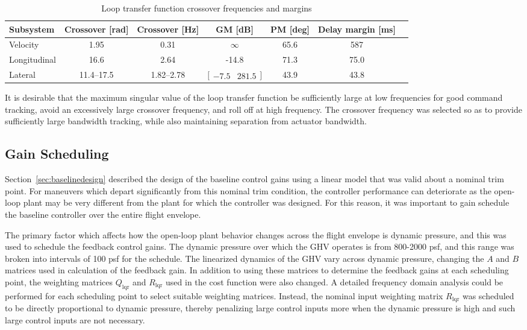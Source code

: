 \documentclass[]{../sty/aiaa-tc}
\begin{document}
  \begin{table}[H]
    \centering
    \caption{Loop transfer function crossover frequencies and margins\label{tab:crossover}}
    \small
    \begin{tabular}{lcccccc}
      \toprule
      Subsystem & Crossover [rad] & Crossover [Hz] & GM [dB] & PM [deg] & Delay margin [ms] \\
      \midrule
      Velocity & 1.95 & 0.31 & $\infty$ & 65.6 & 587 \\
      Longitudinal & 16.6 & 2.64 & -14.8 & 71.3 & 75.0 \\
      Lateral & 11.4--17.5 & 1.82--2.78 & $\bigr[
      \begin{array}{cc}
        -7.5 & 281.5
      \end{array}\bigr]$ & 43.9 & 43.8 \\
      \bottomrule
    \end{tabular}
  \end{table}

  It is desirable that the maximum singular value of the loop transfer function be sufficiently large at low frequencies for good command tracking, avoid an excessively large crossover frequency, and roll off at high frequency.
  The crossover frequency was selected so as to provide sufficiently large bandwidth tracking, while also maintaining separation from actuator bandwidth.

  \subsection{Gain Scheduling}

  Section~\ref{sec:baselinedesign} described the design of the baseline control gains using a linear model that was valid about a nominal trim point.
  For maneuvers which depart significantly from this nominal trim condition, the controller performance can deteriorate as the open-loop plant may be very different from the plant for which the controller was designed.
  For this reason, it was important to gain schedule the baseline controller over the entire flight envelope.

  The primary factor which affects how the open-loop plant behavior changes across the flight envelope is dynamic pressure, and this was used to schedule the feedback control gains.
  The dynamic pressure over which the GHV operates is from 800-2000 psf, and this range was broken into intervals of 100 psf for the schedule.
  The linearized dynamics of the GHV vary across dynamic pressure, changing the $A$ and $B$ matrices used in calculation of the feedback gain.
  In addition to using these matrices to determine the feedback gains at each scheduling point, the weighting matrices $Q_{\text{lqr}}$ and $R_{\text{lqr}}$ used in the cost function were also changed.
  A detailed frequency domain analysis could be performed for each scheduling point to select suitable weighting matrices.
  Instead, the nominal input weighting matrix $R_{\text{lqr}}$ was scheduled to be directly proportional to dynamic pressure, thereby penalizing large control inputs more when the dynamic pressure is high and such large control inputs are not necessary.
\end{document}
